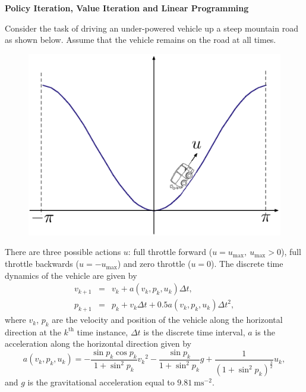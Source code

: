 \documentclass[uebung]{ETHIDSCprogramming_dpoc}
\begin{document}
\maketitle

\begin{center}
\vspace{0.6cm}
\large\textbf{Policy Iteration, Value Iteration and Linear Programming}
\end{center}
\medskip

Consider the task of driving an under-powered vehicle up a steep mountain road as shown below. Assume that the vehicle remains on the road at all times.
\begin{figure}[h!]
\begin{center}
    \includegraphics[scale=0.6]{img/mceps.eps}
\end{center}
\end{figure}

There are three possible actions $u$: full throttle forward ($u=u_{\mathrm{max}}, \ u_{\mathrm{max}} > 0$), full throttle backwards ($u=-u_{\mathrm{max}}$) and zero throttle ($u=0$). The discrete time dynamics of the vehicle are given by
\begin{eqnarray}
v_{k+1} &=& v_k + a(v_k,p_k,u_k) \Delta t,  \nonumber \\
p_{k+1} &=& p_k + v_k  \Delta t + 0.5 a(v_k,p_k,u_k) {\Delta t}^2,  \nonumber
\end{eqnarray}
where $v_k$, $p_k$ are the velocity and position of the vehicle along the horizontal direction at the $k^\mathrm{th}$ time instance, $\Delta t$ is the discrete time interval, $a$ is the acceleration along the horizontal direction given by
\begin{equation}
a(v_k,p_k,u_k) = -\frac{\sin p_k \cos p_k}{1+\sin^2 p_k} {v_k}^2 -  \frac{\sin p_k}{1+\sin^2 p_k} g +\frac{1}{(1+\sin^2 p_k)^\frac{3}{2}} u_k \nonumber, 
\end{equation}
and $g$ is the gravitational acceleration equal to $9.81\ \mathrm{ms}^{-2}$. 
\end{document}
